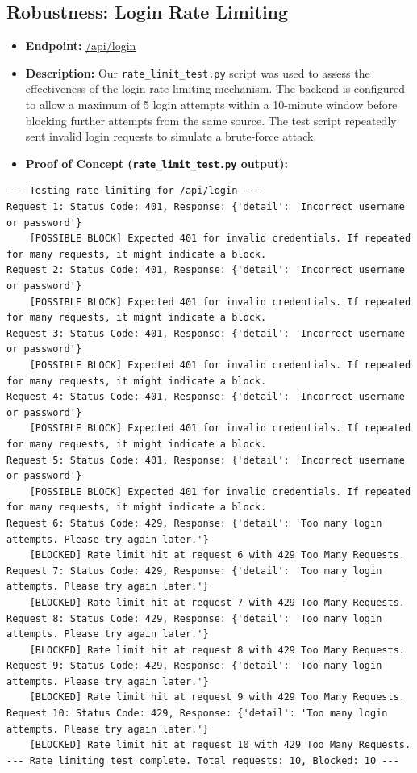 \documentclass{article}
\begin{document}
\subsection{\texorpdfstring{\textbf{Robustness: Login Rate Limiting}}{Robustness: Login Rate Limiting}}
\begin{itemize}
    \item \textbf{Endpoint:} \url{/api/login}
    \item \textbf{Description:}
    Our \texttt{rate\_limit\_test.py} script was used to assess the effectiveness of the login rate-limiting mechanism. The backend is configured to allow a maximum of 5 login attempts within a 10-minute window before blocking further attempts from the same source. The test script repeatedly sent invalid login requests to simulate a brute-force attack.
    \item \textbf{Proof of Concept (\texttt{rate\_limit\_test.py} output):}
\end{itemize}
\begin{lstlisting}[language=text, caption=Output from \texttt{rate\_limit\_test.py} (Login Rate Limiting)]
--- Testing rate limiting for /api/login ---
Request 1: Status Code: 401, Response: {'detail': 'Incorrect username or password'}
    [POSSIBLE BLOCK] Expected 401 for invalid credentials. If repeated for many requests, it might indicate a block.
Request 2: Status Code: 401, Response: {'detail': 'Incorrect username or password'}
    [POSSIBLE BLOCK] Expected 401 for invalid credentials. If repeated for many requests, it might indicate a block.
Request 3: Status Code: 401, Response: {'detail': 'Incorrect username or password'}
    [POSSIBLE BLOCK] Expected 401 for invalid credentials. If repeated for many requests, it might indicate a block.
Request 4: Status Code: 401, Response: {'detail': 'Incorrect username or password'}
    [POSSIBLE BLOCK] Expected 401 for invalid credentials. If repeated for many requests, it might indicate a block.
Request 5: Status Code: 401, Response: {'detail': 'Incorrect username or password'}
    [POSSIBLE BLOCK] Expected 401 for invalid credentials. If repeated for many requests, it might indicate a block.
Request 6: Status Code: 429, Response: {'detail': 'Too many login attempts. Please try again later.'}
    [BLOCKED] Rate limit hit at request 6 with 429 Too Many Requests.
Request 7: Status Code: 429, Response: {'detail': 'Too many login attempts. Please try again later.'}
    [BLOCKED] Rate limit hit at request 7 with 429 Too Many Requests.
Request 8: Status Code: 429, Response: {'detail': 'Too many login attempts. Please try again later.'}
    [BLOCKED] Rate limit hit at request 8 with 429 Too Many Requests.
Request 9: Status Code: 429, Response: {'detail': 'Too many login attempts. Please try again later.'}
    [BLOCKED] Rate limit hit at request 9 with 429 Too Many Requests.
Request 10: Status Code: 429, Response: {'detail': 'Too many login attempts. Please try again later.'}
    [BLOCKED] Rate limit hit at request 10 with 429 Too Many Requests.
--- Rate limiting test complete. Total requests: 10, Blocked: 10 ---
\end{lstlisting}
\end{document}
